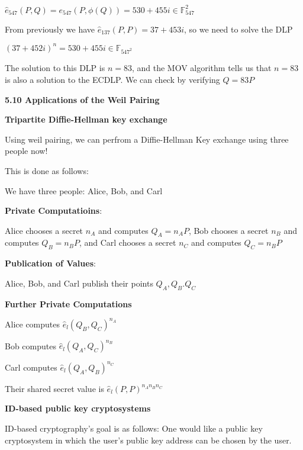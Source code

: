 \documentclass[titlepage]{article}
\begin{document}
\begin{center} 
$\hat{e}_{547}(P,Q) = e_{547}(P, \phi (Q)) = 530 + 455i \in \mathbb{F}_{547}^2$
\end{center} 

From previously we have $\hat{e}_{137}(P,P) = 37 + 453i$, so we need to solve the DLP

\begin{center} 
$(37 + 452i)^n = 530 + 455i \in \mathbb{F}_{547^2}$
\end{center} 

The solution to this DLP is $n=83$, and the MOV algorithm tells us that $n=83$ is also a solution to the ECDLP. We can check by verifying $Q=83P$

\vspace{5mm}

\textbf{5.10 Applications of the Weil Pairing}

\textbf{Tripartite Diffie-Hellman key exchange}

Using weil pairing, we can perfrom a Diffie-Hellman Key exchange using three people now!

This is done as follows: 

\begin{center} 

We have three people: Alice, Bob, and Carl

\textbf{Private Computatioins}: 

Alice chooses a secret $n_A$ and computes $Q_A = n_AP$, Bob chooses a secret $n_B$ and computes $Q_B= n_BP$, and Carl chooses a secret $n_C$ and computes $Q_C= n_BP$

\textbf{Publication of Values}:

 Alice, Bob, and Carl publish their points $Q_A, Q_B. Q_C$

\textbf{Further Private Computations} 

Alice computes $\hat{e}_l(Q_B,Q_C)^{n_A}$

Bob computes $\hat{e}_l(Q_A,Q_C)^{n_B}$

Carl computes $\hat{e}_l(Q_A,Q_B)^{n_C}$

\vspace{5mm}

Their shared secret value is $\hat{e}_l(P,P)^{n_A n_B n_C}$

\end{center} 

\textbf{ID-based public key cryptosystems}

ID-based cryptography's goal is as follows: One would like a public key cryptosystem in which the user's public key address can be chosen by the user. 
\end{document}
